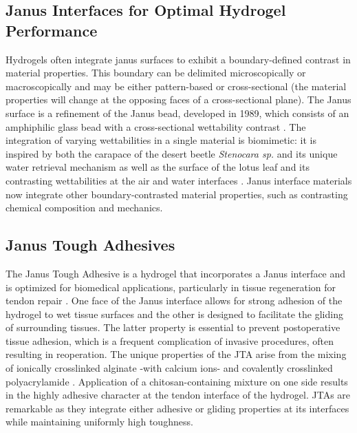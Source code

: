 \subsection{Janus Interfaces for Optimal Hydrogel Performance}
Hydrogels often integrate janus surfaces to exhibit a boundary-defined contrast in material properties. This boundary can be delimited microscopically or macroscopically and may be either pattern-based or cross-sectional (the material properties will change at the opposing faces of a cross-sectional plane). The Janus surface is a refinement of the Janus bead, developed in 1989, which consists of an amphiphilic glass bead with a cross-sectional wettability contrast \autocite{janus_interface}. The integration of varying wettabilities in a single material is biomimetic: it is inspired by both the carapace of the desert beetle \textit{Stenocara sp.} and its unique water retrieval mechanism as well as the surface of the lotus leaf and its contrasting wettabilities at the air and water interfaces \autocite{janus_interface}. Janus interface materials now integrate other boundary-contrasted material properties, such as contrasting chemical composition and mechanics. 

\subsection{Janus Tough Adhesives}
The Janus Tough Adhesive is a hydrogel that incorporates a Janus interface and is optimized for biomedical applications, particularly in tissue regeneration for tendon repair \autocite{jta_poc}. One face of the Janus interface allows for strong adhesion of the hydrogel to wet tissue surfaces and the other is designed to facilitate the gliding of surrounding tissues. The latter property is essential to prevent postoperative tissue adhesion, which is a frequent complication of invasive procedures, often resulting in reoperation. The unique properties of the JTA arise from the mixing of ionically crosslinked alginate -with calcium ions- and covalently crosslinked polyacrylamide \autocite{jta_poc}. Application of a chitosan-containing mixture on one side results in the highly adhesive character at the tendon interface of the hydrogel. JTAs are remarkable as they integrate either adhesive or gliding properties at its interfaces while maintaining uniformly high toughness. 

